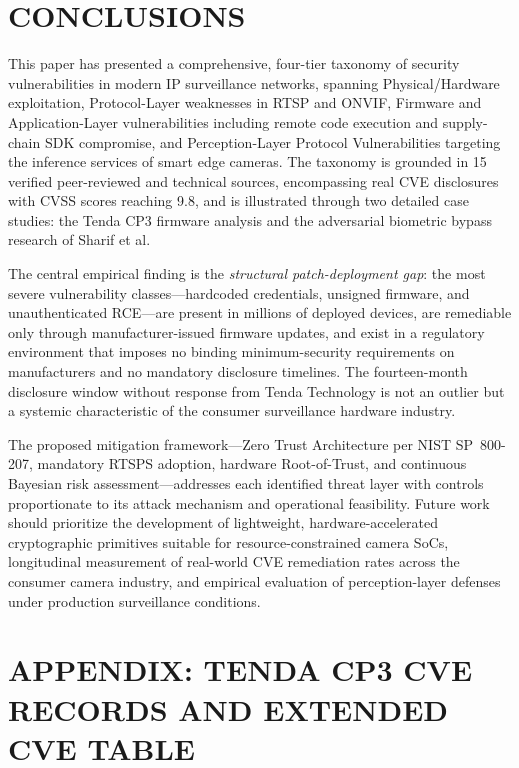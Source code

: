 \documentclass[letterpaper, 10pt, conference]{ieeeconf}
\begin{document}
\section{CONCLUSIONS}

This paper has presented a comprehensive, four-tier taxonomy of
security vulnerabilities in modern IP surveillance networks, spanning
Physical/Hardware exploitation, Protocol-Layer weaknesses in RTSP and
ONVIF, Firmware and Application-Layer vulnerabilities including remote
code execution and supply-chain SDK compromise, and Perception-Layer
Protocol Vulnerabilities targeting the inference services of smart
edge cameras. The taxonomy is grounded in 15 verified peer-reviewed
and technical sources, encompassing real CVE disclosures with CVSS
scores reaching 9.8, and is illustrated through two detailed case
studies: the Tenda CP3 firmware analysis and the adversarial biometric
bypass research of Sharif et al.

The central empirical finding is the \textit{structural patch-deployment
gap}: the most severe vulnerability classes---hardcoded credentials,
unsigned firmware, and unauthenticated RCE---are present in millions
of deployed devices, are remediable only through manufacturer-issued
firmware updates, and exist in a regulatory environment that imposes
no binding minimum-security requirements on manufacturers and no
mandatory disclosure timelines. The fourteen-month disclosure
window without response from Tenda Technology \cite{stabili2024} is
not an outlier but a systemic characteristic of the consumer
surveillance hardware industry.

The proposed mitigation framework---Zero Trust Architecture per NIST
SP~800-207, mandatory RTSPS adoption, hardware Root-of-Trust, and
continuous Bayesian risk assessment---addresses each identified threat
layer with controls proportionate to its attack mechanism and
operational feasibility. Future work should prioritize the development
of lightweight, hardware-accelerated cryptographic primitives suitable
for resource-constrained camera SoCs, longitudinal measurement of
real-world CVE remediation rates across the consumer camera
industry, and empirical evaluation of perception-layer defenses under
production surveillance conditions.

\addtolength{\textheight}{-1.5cm}

\section*{APPENDIX: TENDA CP3 CVE RECORDS AND EXTENDED CVE TABLE}
\end{document}

